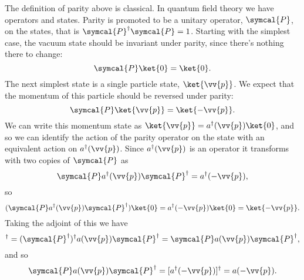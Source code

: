 \documentclass[fleqn]{NotesClass}
\newcommand{\parity}{\symcal{P}}
\newcommand{\hermit}{{\dagger}}
\begin{document}
    The definition of parity above is classical.
    In quantum field theory we have operators and states.
    Parity is promoted to be a unitary operator, \(\parity\), on the states, that is \(\parity^\hermit \parity = 1\).
    Starting with the simplest case, the vacuum state should be invariant under parity, since there's nothing there to change:
    \begin{equation}
        \parity \ket{0} = \ket{0}.
    \end{equation}
    The next simplest state is a single particle state, \(\ket{\vv{p}}\).
    We expect that the momentum of this particle should be reversed under parity:
    \begin{equation}
        \parity \ket{\vv{p}} = \ket{-\vv{p}}.
    \end{equation}
    We can write this momentum state as \(\ket{\vv{p}} = a^\hermit(\vv{p})\ket{0}\), and so we can identify the action of the parity operator on the state with an equivalent action on \(a^\hermit(\vv{p})\).
    Since \(a^\hermit(\vv{p})\) is an operator it transforms with two copies of \(\parity\) as
    \begin{equation}
        \parity a^\hermit(\vv{p}) \parity^{\hermit} = a^\hermit(-\vv{p}),
    \end{equation}
    so
    \begin{equation}
        (\parity a^\hermit(\vv{p}) \parity^\hermit)\ket{0} = a^\hermit(-\vv{p}) \ket{0} = \ket{-\vv{p}}.
    \end{equation}
    Taking the adjoint of this we have
    \begin{equation}
        [\parity a^\hermit(\vv{p}) \parity]^\hermit = (\parity^\hermit)^\hermit a(\vv{p}) \parity^\hermit = \parity a(\vv{p}) \parity^\hermit,
    \end{equation}
    and so
    \begin{equation}
        \parity a(\vv{p}) \parity^\hermit = [a^\hermit(-\vv{p})]^\hermit = a(-\vv{p}).
    \end{equation}
    
\end{document}
